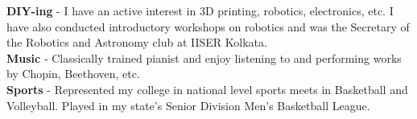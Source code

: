 \documentclass[10pt,a4paper]{article}
\begin{document}
\spacedhrule{1.6em}{-0.4em}
	  \textbf{DIY-ing} - I have an active interest in 3D printing, robotics, electronics, etc. I have also conducted introductory workshops on robotics and was the Secretary of the Robotics and Astronomy club at IISER Kolkata.\\
	  \textbf{Music} - Classically trained pianist and enjoy listening to and performing works by Chopin, Beethoven, etc.\\
	  \textbf{Sports} - Represented my college in national level sports meets in Basketball and Volleyball. Played in my state's Senior Division Men's Basketball League.\\

\spacedhrule{1.6em}{-0.4em}
\end{document}
